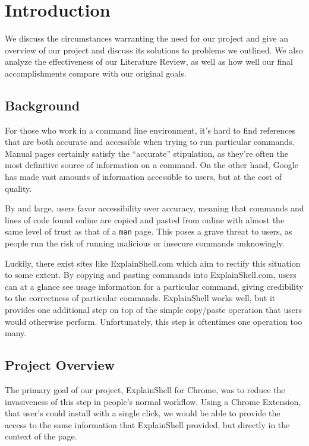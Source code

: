 \documentclass[11pt]{article}
\begin{document}
\section{Introduction}

We discuss the circumstances warranting the need for our project and give an
overview of our project and discuss its solutions to problems we outlined. We
also analyze the effectiveness of our Literature Review, as well as how well our
final accomplishments compare with our original goals.

\subsection{Background}

For those who work in a command line environment, it's hard to find references
that are both accurate and accessible when trying to run particular commands.
Manual pages certainly satisfy the ``accurate'' stipulation, as they're often
the most definitive source of information on a command. On the other hand,
Google has made vast amounts of information accessible to users, but at the cost
of quality.

By and large, users favor accessibility over accuracy, meaning that commands and
lines of code found online are copied and pasted from online with almost the
same level of trust as that of a \texttt{man} page. This poses a grave threat to
users, as people run the risk of running malicious or insecure commands
unknowingly.

Luckily, there exist sites like ExplainShell.com which aim to rectify this
situation to some extent. By copying and pasting commands into ExplainShell.com,
users can at a glance see usage information for a particular command, giving
credibility to the correctness of particular commands. ExplainShell works well,
but it provides one additional step on top of the simple copy/paste operation
that users would otherwise perform. Unfortunately, this step is oftentimes one
operation too many.

\subsection{Project Overview}

The primary goal of our project, ExplainShell for Chrome, was to reduce the
invasiveness of this step in people's normal workflow. Using a Chrome Extension,
that user's could install with a single click, we would be able to provide the
access to the same information that ExplainShell provided, but directly in the
context of the page.
\end{document}
